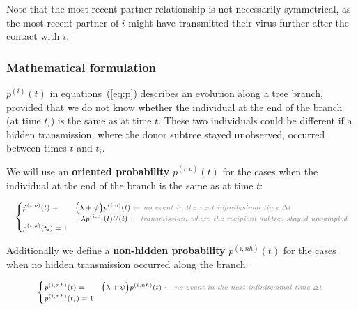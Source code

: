 \documentclass[a4paper,10pt]{article}
\begin{document}
Note that the most recent partner relationship is not necessarily symmetrical, as the most recent partner of $i$ might have transmitted their virus further after the contact with $i$. 

\subsubsection{Mathematical formulation}
$p^{(i)}(t)$ in equations~(\ref{eq:p}) describes an evolution along a tree branch, provided that we do not know whether the individual at the end of the branch (at time $t_i$) is the same as at time $t$. These two individuals could be different if a hidden transmission, where the donor subtree stayed unobserved, occurred between times $t$ and $t_i$.

We will use an \textbf{oriented probability} $p^{(i,o)}(t)$ for the cases when the individual at the end of the branch is the same as at time $t$:

\begin{equation}
\scriptsize
\begin{cases}
\dot{p}^{(i,o)}(t) = & \Big(\lambda + \psi\Big) p^{(i,o)}(t)\; \textit{\color{gray} $\leftarrow$ no event in the next infinitesimal time $\Delta t$ }\\
    & - \lambda p^{(i,o)}(t)U(t)\;  \textit{\color{gray} $\leftarrow$ transmission, where the recipient subtree stayed unsampled}\\
p^{(i,o)}(t_i) = 1\label{eq:p-o}
\end{cases}
\end{equation}


Additionally we define a \textbf{non-hidden probability} $p^{(i,nh)}(t)$ for the cases when no hidden transmission occurred along the branch:

\begin{equation}
\scriptsize
\begin{cases}
\dot{p}^{(i,nh)}(t) = & \Big(\lambda + \psi\Big) p^{(i,nh)}(t)\; \textit{\color{gray} $\leftarrow$ no event in the next infinitesimal time $\Delta t$ }\\
p^{(i,nh)}(t_i) = 1\label{eq:p-nh}
\end{cases}
\end{equation}
\end{document}
